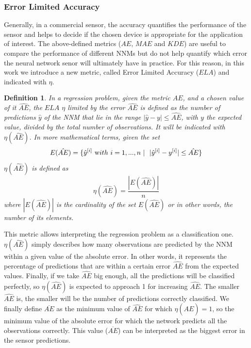 \documentclass[sensors,article,submit,moreauthors,pdftex,10pt,a4paper]{Definitions/mdpi}
\newtheorem*{definition*}{Definition}
\begin{document}
\subsubsection{Error Limited Accuracy}
\label{sektion:ela}

Generally, in a commercial sensor, the accuracy quantifies the performance of the sensor and helps to decide if the chosen device is appropriate for the application of interest. The above-defined metrics ($AE$, $MAE$ and $KDE$) are useful to compare the performance of different NNMs but do not help quantify which error the neural network senor will ultimately have in practice.
For this reason, in this work we introduce a new metric, called Error Limited Accuracy ($ELA$) and indicated with $\eta$.

\begin{definition*}
In a regression problem, given the metric $AE$, and a chosen value of it $\hat{AE}$, the $ELA$  $\eta$ limited by the error $\hat{AE}$ is defined as the number of predictions $\hat y$ of the NNM that lie in the range $|\hat y-y|\leq \hat{AE}$, with $y$ the expected value, divided by the total number of observations. It will be indicated with $\eta(\hat{AE})$. In more mathematical terms, given the set
\begin{equation}
E(\hat{AE}) = \{ \hat y^{[i]} \ {\text with } \ i = 1,..., n\ | \ \ |\hat y^{[i]}-y^{[i]}|\leq \hat{AE} \} 
\end{equation}
$\eta(\hat{AE})$ is defined as
\begin{equation}
\eta(\hat{AE}) = \frac{|E(\hat{AE})|}{n}
\end{equation}
where $|E(\hat{AE})|$ is the cardinality of the set $E(\hat{AE})$ or in other words, the number of its elements.
\end{definition*}

This metric allows interpreting the regression problem as a classification one. $\eta(\hat{AE})$ simply describes how many observations are predicted by the NNM within a given value of the absolute error. In other words, it represents the percentage of predictions that are within a certain error $\hat{AE}$ from the expected values. Finally, if we take $\hat{AE}$ big enough, all the predictions will be classified perfectly, so $\eta(\hat{AE})$ is expected to approach 1 for increasing $\hat{AE}$. The smaller $\hat{AE}$ is, the smaller will be the number of predictions correctly classified. We finally define $\overline{AE}$ as the minimum value of $\hat{AE}$ for which $\eta(\hat{AE})=1$, so the minimum value of the absolute error for which the network predicts all the observations correctly. This value ($\overline{AE}$) can be interpreted as the biggest error in the sensor predictions.
\end{document}
